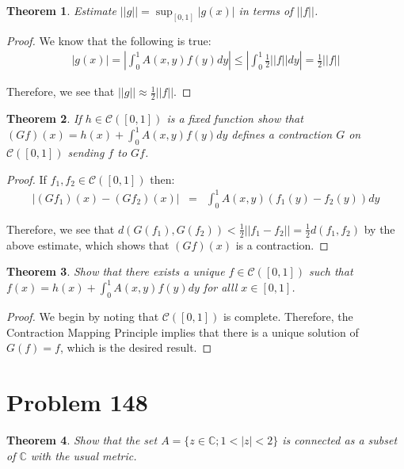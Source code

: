 \documentclass[psamsfonts]{amsart}
\newtheorem{thm}{Theorem}[section]
\theoremstyle{definition}
\theoremstyle{remark}
\numberwithin{equation}{section}
\begin{document}
\begin{thm}
Estimate $||g|| = \sup_{[0,1]} |g(x)|$ in terms of $||f||$. 
\end{thm}

\begin{proof}
We know that the following is true:
\begin{eqnarray}
|g(x)| = \left|\int_0^1 A(x,y) f(y) dy \right| \leq \left|\int_0^1 \frac{1}{2} ||f|| dy \right| = \frac{1}{2} ||f|| 
\end{eqnarray} 

Therefore, we see that $||g|| \approx \frac{1}{2} ||f||$. 
\end{proof}

\begin{thm}
If $h \in \mathscr{C}([0,1])$ is a fixed function show that $(Gf)(x) = h(x) + \int_0^1 A(x,y) f(y) dy$ defines a contraction $G$ on $\mathscr{C}([0,1])$ sending $f$ to $Gf$. 
\end{thm}

\begin{proof}
If $f_1, f_2 \in \mathscr{C}([0,1])$ then:
\begin{eqnarray}
|(Gf_1)(x) - (Gf_2)(x)| &=& \int_0^1 A(x,y) (f_1(y) - f_2(y)) dy
\end{eqnarray}

Therefore, we see that $d(G(f_1), G(f_2)) < \frac{1}{2} || f_1 - f_2 || = \frac{1}{2} d(f_1,f_2)$ by the above estimate, which shows that $(Gf)(x)$ is a contraction.
\end{proof}

\begin{thm}
Show that there exists a unique $f \in \mathscr{C}([0,1])$ such that $f(x) = h(x) + \int_0^1 A(x,y) f(y) dy$ for alll $x \in [0,1]$. 
\end{thm}

\begin{proof}
We begin by noting that $\mathscr{C}([0,1])$ is complete. Therefore, the Contraction Mapping Principle implies that there is a unique solution of $G(f) = f$, which is the desired result.
\end{proof}

\section{Problem 148}

\begin{thm}
Show that the set $A = \{ z \in \mathbb{C}; 1 < |z| < 2 \}$ is connected as a subset of $\mathbb{C}$ with the usual metric.
\end{thm}
\end{document}
